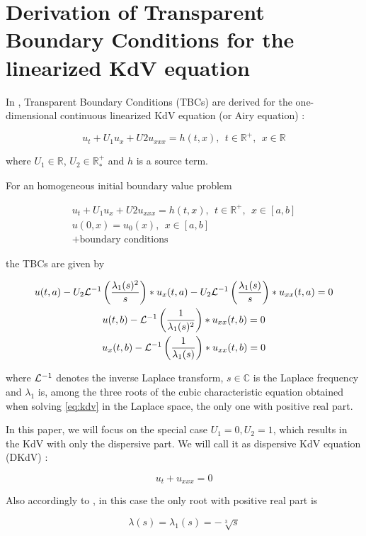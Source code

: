 \section{Derivation of Transparent Boundary Conditions for the linearized KdV equation}

\indent In \cite{besse2015}, Transparent Boundary Conditions (TBCs) are derived for the one-dimensional continuous linearized KdV equation (or Airy equation) :

\begin{equation}
 	\label{eq:LKdV}
 	u_t + U_1u_x + U2u_{xxx} = h(t,x), \ \ t \in \mathbb{R}^+, \ \ x \in \mathbb{R}
\end{equation}

\noindent where $U_1 \in \mathbb{R}$, $U_2 \in \mathbb{R}^+_*$ and $h$ is a source term.

\indent For an homogeneous initial boundary value problem 

\begin{gather}
	u_t + U_1u_x + U2u_{xxx} = h(t,x), \ \ t \in \mathbb{R}^+, \ \ x \in [a,b] \\
	u(0,x) = u_0(x), \ \ x \in [a,b] \\
	+ \text{boundary conditions} \nonumber
\end{gather}

\noindent the TBCs are given by 

\begin{gather}
        \label{eq:continuousTBC1}
        u(t,a) - U_2 \mathcal{L}^{-1} \left( \frac{\lambda_1(s)^2}{s} \right) * u_x(t,a) - U_2 \mathcal{L}^{-1} \left( \frac{\lambda_1(s)}{s} \right) * u_{xx}(t,a) = 0 \\
		\label{eq:continuousTBC2}        
        u(t,b) - \mathcal{L}^{-1} \left( \frac{1}{\lambda_1(s)^2} \right) * u_{xx}(t,b) = 0 \\
        \label{eq:continuousTBC3}   
        u_x(t,b) - \mathcal{L}^{-1} \left( \frac{1}{\lambda_1(s)} \right) * u_{xx}(t,b) = 0 
\end{gather}

\noindent where $\mathcal{L}^{-1}$ denotes the inverse Laplace transform, $s \in \mathbb{C}$ is the Laplace frequency and $\lambda_1$ is, among the three roots of the cubic characteristic equation obtained when solving \eqref{eq:kdv} in the Laplace space, the only one with positive real part.

\indent In this paper, we will focus on the special case $U_1 = 0, U_2 = 1$, which results in the KdV with only the dispersive part. We will call it as dispersive KdV equation (DKdV) : 

\begin{equation}
	\label{eq:DKdV}
	u_t + u_{xxx} = 0
\end{equation}

\indent Also accordingly to \cite{besse2015}, in this case the only root with positive real part is 

\begin{equation}
	\label{eq:lambda}
			\lambda(s) = \lambda_1(s) =  -\sqrt[3]{s} 
\end{equation}